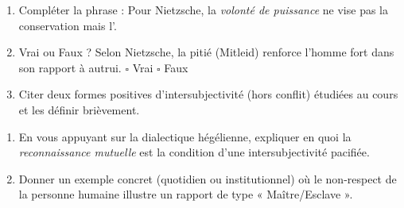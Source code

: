 \documentclass[11pt]{article}
\begin{document}
\begin{exercice}
\begin{enumerate}
    \item Compléter la phrase : Pour Nietzsche, la \textit{volonté de puissance} ne vise pas la conservation mais l'\underline{\hspace{4cm}}.
    \item Vrai ou Faux ? Selon Nietzsche, la pitié (Mitleid) renforce l'homme fort dans son rapport à autrui. \hfill $\square$ Vrai \quad $\square$ Faux
    \item Citer deux formes positives d'intersubjectivité (hors conflit) étudiées au cours et les définir brièvement.
\end{enumerate}
\end{exercice}

\begin{exercice}
\begin{enumerate}
    \item En vous appuyant sur la dialectique hégélienne, expliquer en quoi la \textit{reconnaissance mutuelle} est la condition d'une intersubjectivité pacifiée.
    \item Donner un exemple concret (quotidien ou institutionnel) où le non-respect de la personne humaine illustre un rapport de type « Maître/Esclave ».
\end{enumerate}
\end{exercice}
\end{document}
